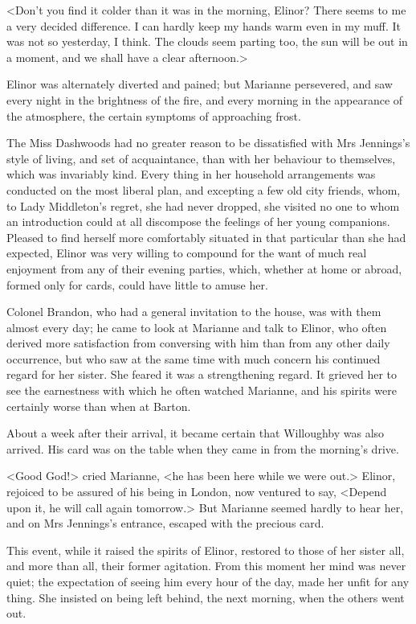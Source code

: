 <Don't you find it colder than it was in the morning, Elinor? There seems to me a very decided difference. I can hardly keep my hands warm even in my muff. It was not so yesterday, I think. The clouds seem parting too, the sun will be out in a moment, and we shall have a clear afternoon.>

Elinor was alternately diverted and pained; but Marianne persevered, and saw every night in the brightness of the fire, and every morning in the appearance of the atmosphere, the certain symptoms of approaching frost.

The Miss Dashwoods had no greater reason to be dissatisfied with Mrs Jennings's style of living, and set of acquaintance, than with her behaviour to themselves, which was invariably kind. Every thing in her household arrangements was conducted on the most liberal plan, and excepting a few old city friends, whom, to Lady Middleton's regret, she had never dropped, she visited no one to whom an introduction could at all discompose the feelings of her young companions. Pleased to find herself more comfortably situated in that particular than she had expected, Elinor was very willing to compound for the want of much real enjoyment from any of their evening parties, which, whether at home or abroad, formed only for cards, could have little to amuse her.

Colonel Brandon, who had a general invitation to the house, was with them almost every day; he came to look at Marianne and talk to Elinor, who often derived more satisfaction from conversing with him than from any other daily occurrence, but who saw at the same time with much concern his continued regard for her sister. She feared it was a strengthening regard. It grieved her to see the earnestness with which he often watched Marianne, and his spirits were certainly worse than when at Barton.

About a week after their arrival, it became certain that Willoughby was also arrived. His card was on the table when they came in from the morning's drive.

<Good God!> cried Marianne, <he has been here while we were out.> Elinor, rejoiced to be assured of his being in London, now ventured to say, <Depend upon it, he will call again tomorrow.> But Marianne seemed hardly to hear her, and on Mrs Jennings's entrance, escaped with the precious card.

This event, while it raised the spirits of Elinor, restored to those of her sister all, and more than all, their former agitation. From this moment her mind was never quiet; the expectation of seeing him every hour of the day, made her unfit for any thing. She insisted on being left behind, the next morning, when the others went out.

